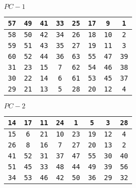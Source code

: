 \documentclass{article}
\begin{document}
\begin{center}
\vspace{20pt}

$PC-1$ 
\vspace{10pt}

\begin{tabular}{|cccccccc|}
\hline
\texttt{57} & \texttt{49} & \texttt{41} & \texttt{33} & \texttt{25} & \texttt{17} & \texttt{9} & \texttt{1} \\
\hline
\texttt{58} & \texttt{50} & \texttt{42} & \texttt{34} & \texttt{26} & \texttt{18} & \texttt{10} & \texttt{2} \\
\hline
\texttt{59} & \texttt{51} & \texttt{43} & \texttt{35} & \texttt{27} & \texttt{19} & \texttt{11} & \texttt{3} \\
\hline
\texttt{60} & \texttt{52} & \texttt{44} & \texttt{36} & \texttt{63} & \texttt{55} & \texttt{47} & \texttt{39} \\
\hline
\texttt{31} & \texttt{23} & \texttt{15} & \texttt{7} & \texttt{62} & \texttt{54} & \texttt{46} & \texttt{38} \\
\hline
\texttt{30} & \texttt{22} & \texttt{14} & \texttt{6} & \texttt{61} & \texttt{53} & \texttt{45} & \texttt{37} \\
\hline
\texttt{29} & \texttt{21} & \texttt{13} & \texttt{5} & \texttt{28} & \texttt{20} & \texttt{12} & \texttt{4} \\
\hline
\end{tabular}

\vspace{20pt}

$PC-2$ \\
\vspace{10pt}
\begin{tabular}{|cccccccc|}
\hline
\texttt{14} & \texttt{17} & \texttt{11} & \texttt{24} & \texttt{1} & \texttt{5} & \texttt{3} & \texttt{28}\\
\hline
\texttt{15} & \texttt{6} & \texttt{21} & \texttt{10} & \texttt{23} & \texttt{19} & \texttt{12} & \texttt{4}\\
\hline
\texttt{26} & \texttt{8} & \texttt{16} & \texttt{7} & \texttt{27} & \texttt{20} & \texttt{13} & \texttt{2}\\
\hline
\texttt{41} & \texttt{52} & \texttt{31} & \texttt{37} & \texttt{47} & \texttt{55} & \texttt{30} & \texttt{40}\\
\hline
\texttt{51} & \texttt{45} & \texttt{33} & \texttt{48} & \texttt{44} & \texttt{49} & \texttt{39} & \texttt{56}\\
\hline
\texttt{34} & \texttt{53} & \texttt{46} & \texttt{42} & \texttt{50} & \texttt{36} & \texttt{29} & \texttt{32}\\
\hline
\end{tabular}

  \end{center}
\end{document}
